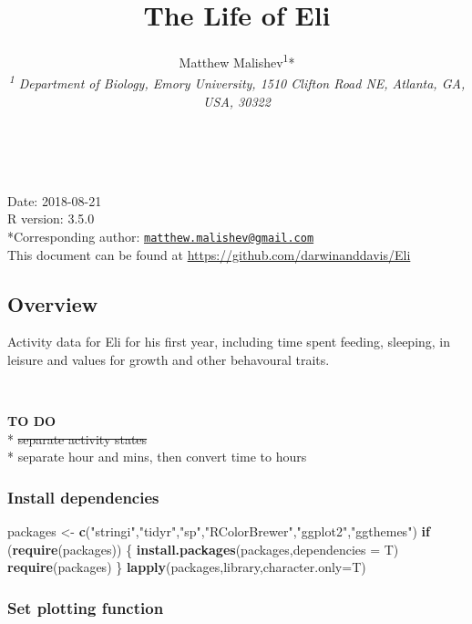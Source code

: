 \documentclass[10,portrait]{article}
\title{The Life of Eli}
\author{Matthew Malishev\textsuperscript{1}*\\
\emph{\textsuperscript{1} Department of Biology, Emory University, 1510
Clifton Road NE, Atlanta, GA, USA, 30322}}
\date{}
\newenvironment{Shaded}{\begin{snugshade}}{\end{snugshade}}
\newcommand{\KeywordTok}[1]{\textcolor[rgb]{0.13,0.29,0.53}{\textbf{#1}}}
\newcommand{\DataTypeTok}[1]{\textcolor[rgb]{0.13,0.29,0.53}{#1}}
\newcommand{\StringTok}[1]{\textcolor[rgb]{0.31,0.60,0.02}{#1}}
\newcommand{\ControlFlowTok}[1]{\textcolor[rgb]{0.13,0.29,0.53}{\textbf{#1}}}
\newcommand{\NormalTok}[1]{#1}
\begin{document}
\maketitle

{
\hypersetup{linkcolor=black}
\setcounter{tocdepth}{4}
\tableofcontents
}
~

Date: 2018-08-21\\
R version: 3.5.0\\
*Corresponding author:
\href{mailto:matthew.malishev@gmail.com}{\nolinkurl{matthew.malishev@gmail.com}}\\
This document can be found at
\url{https://github.com/darwinanddavis/Eli}

\newpage  

\subsection{Overview}\label{overview}

Activity data for Eli for his first year, including time spent feeding,
sleeping, in leisure and values for growth and other behavoural traits.

~

\textbf{TO DO}\\
* \sout{separate activity states}\\
* separate hour and mins, then convert time to hours

\subsubsection{Install dependencies}\label{install-dependencies}

\begin{Shaded}
\begin{Highlighting}[]
\NormalTok{packages <-}\StringTok{ }\KeywordTok{c}\NormalTok{(}\StringTok{"stringi"}\NormalTok{,}\StringTok{"tidyr"}\NormalTok{,}\StringTok{"sp"}\NormalTok{,}\StringTok{"RColorBrewer"}\NormalTok{,}\StringTok{"ggplot2"}\NormalTok{,}\StringTok{"ggthemes"}\NormalTok{)   }
\ControlFlowTok{if}\NormalTok{ (}\KeywordTok{require}\NormalTok{(packages)) \{}
    \KeywordTok{install.packages}\NormalTok{(packages,}\DataTypeTok{dependencies =}\NormalTok{ T)}
    \KeywordTok{require}\NormalTok{(packages)}
\NormalTok{\}}
\KeywordTok{lapply}\NormalTok{(packages,library,}\DataTypeTok{character.only=}\NormalTok{T)}
\end{Highlighting}
\end{Shaded}

\subsubsection{Set plotting function}\label{set-plotting-function}
\end{document}
